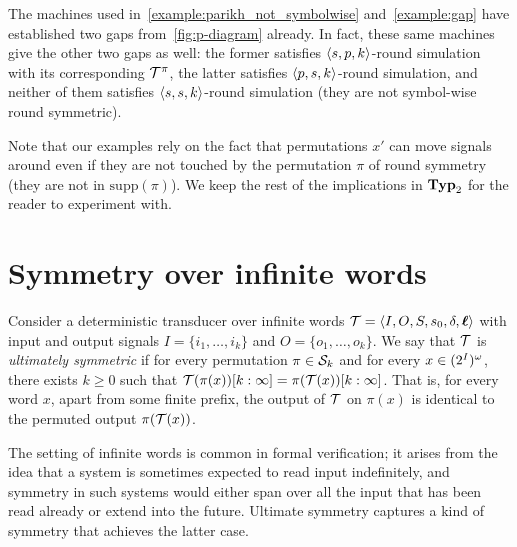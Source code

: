 The machines used in~\autoref{example:parikh_not_symbolwise} and~\autoref{example:gap} have established two gaps from~\autoref{fig:p-diagram} already. In fact, these same machines give the other two gaps as well: the former satisfies $\left< s,p,k\right>$-round simulation with its corresponding $\mathcal{T}^\pi$, the latter satisfies $\left< p,s,k\right>$-round simulation, and neither of them satisfies $\left< s,s,k\right>$-round simulation (they are not symbol-wise round symmetric).

Note that our examples rely on the fact that permutations $x'$ can move signals around even if they are not touched by the permutation $\pi$ of round symmetry (they are not in $\mathrm{supp}(\pi)$). We keep the rest of the implications in $\mathbf{Typ}_2$ for the reader to experiment with.

\section{Symmetry over infinite words}

Consider a deterministic transducer over infinite words $\mathcal{T}=\left< I,O,S,s_0,\delta,\boldsymbol{\ell}\right>$ with input and output signals $I=\{i_1,\ldots,i_k\}$ and $O=\{o_1,\ldots,o_k\}$. We say that $\mathcal{T}$ is \emph{ultimately symmetric} if for every permutation $\pi\in \mathcal{S}_k$ and for every $x\in (2^{I})^\omega$, there exists $k\ge 0$ such that $\mathcal{T}(\pi(x))[k:\infty]=\pi(\mathcal{T}(x))[k:\infty]$. That is, for every word $x$, apart from some finite prefix, the output of $\mathcal{T}$ on $\pi(x)$ is identical to the permuted output $\pi(\mathcal{T}(x))$.

The setting of infinite words is common in formal verification; it arises from the idea that a system is sometimes expected to read input indefinitely, and symmetry in such systems would either span over all the input that has been read already or extend into the future. Ultimate symmetry captures a kind of symmetry that achieves the latter case.

